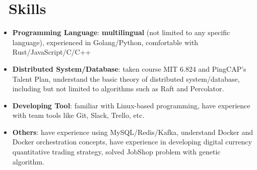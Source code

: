 \documentclass{resume}
\newcommand{\en}[1]{#1}
\newcommand{\zh}[1]{}
\begin{document}
\section{\faCogs\ \en{Skills}\zh{技能}}
\begin{itemize}[parsep=0.25ex]
      \item \en{\textbf{Programming Language}:
                  \textbf{multilingual} (not limited to any specific language), 
                  experienced in Golang/Python, 
                  comfortable with Rust/JavaScript/C/C++}
            \zh{\textbf{编程语言}:
                  \textbf{泛语言}（编程不受特定语言限制），
                  熟悉 Golang/Python，
                  了解 Rust/JavaScript/C/C++ 等}

      \item \en{\textbf{Distributed System/Database}:
                  taken course MIT 6.824 and PingCAP's Talent Plan,
                  understand the basic theory of distributed system/database,
                  including but not limited to algorithms such as Raft and Percolator.}
            \zh{\textbf{分布式系统/数据库}:
                  自主学习了 MIT 6.824 和 PingCAP's Talent Plan 课程，
                  了解分布式系统/数据库的基本理论，包括但不限于 Raft 和 Percolator 等算法}

      \item \en{\textbf{Developing Tool}:
                  familiar with Linux-based programming,
                  have experience with team tools like Git, Slack, Trello, etc.}
            \zh{\textbf{开发工具}:
                  熟悉 Linux，有 Git、Slack、Trello 等团队协作工具的使用经验}

      \item \en{\textbf{Others}:
                  have experience using MySQL/Redis/Kafka, 
                  understand Docker and Docker orchestration concepts, 
                  have experience in developing digital currency quantitative trading strategy, 
                  solved JobShop problem with genetic algorithm.}
            \zh{\textbf{其它}:
                  有 MySQL/Redis/Kafka 使用经验，了解容器及容器编排相关概念，
                  开发过数字货币量化交易策略，使用遗传算法解决过 JobShop 问题}
\end{itemize}
\end{document}
